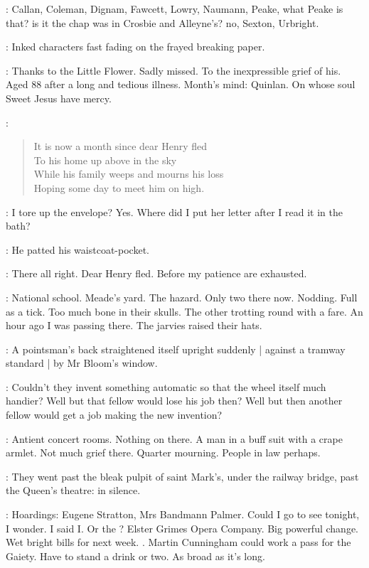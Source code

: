 \BloomInt:
Callan, Coleman, Dignam, Fawcett, Lowry, Naumann,
Peake, what Peake is that?
is it the chap was in Crosbie and Alleyne's?
no, Sexton, Urbright.%

:
Inked characters fast fading on the frayed breaking paper.

\BloomInt:
Thanks to the Little Flower.
Sadly missed.
To the inexpressible grief of his.
Aged 88 after a long and tedious illness.
Month's mind:
Quinlan.
On whose soul Sweet Jesus have mercy.

:
\begin{verse}
    It is now a month since dear Henry fled \\
    To his home up above in the sky \\
    While his family weeps and mourns his loss \\
    Hoping some day to meet him on high.
\end{verse}

\BloomInt:
I tore up the envelope?
Yes.
Where did I put her letter after I read it in the bath?

:
He patted his waistcoat-pocket.

\BloomInt:
There all right.
Dear Henry fled.
Before my patience
are exhausted.

\BloomInt:
National school.
Meade's yard.
The hazard.
Only two there now.
Nodding.
Full as a tick.
Too much bone in their skulls.
The other trotting round with a fare.
An hour ago I was passing there.
The jarvies raised their hats.

:
A pointsman's back straightened itself upright suddenly |
against a tramway standard |
by Mr Bloom's window.

\BloomInt:
Couldn't they invent something automatic
so that the wheel itself much handier?
Well but that fellow would lose his job then?
Well but then another fellow would get a job making the new invention?

\BloomInt:
Antient concert rooms.
Nothing on there.
A man in a buff suit with a crape armlet.
Not much grief there.
Quarter mourning.
People in law perhaps.

:
They went past the bleak pulpit of saint Mark's,
under the railway bridge,
past the Queen's theatre:
in silence.

\BloomInt:
Hoardings:
Eugene Stratton,
Mrs Bandmann Palmer.
Could I go to see  tonight, I wonder.
I said I.
Or the ?
Elster Grimes Opera Company.
Big powerful change.
Wet bright bills for next week.
.
Martin Cunningham could work a pass for the Gaiety.
Have to stand a drink or two.
As broad as it's long.

